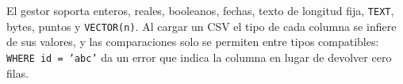 El gestor soporta enteros, reales, booleanos, fechas, texto de longitud fija,
\texttt{TEXT}, bytes, puntos y \texttt{VECTOR(n)}. Al cargar un CSV el tipo de cada columna
se infiere de sus valores, y las comparaciones solo se permiten entre tipos compatibles:
\texttt{WHERE id = 'abc'} da un error que indica la columna en lugar de devolver cero filas.
